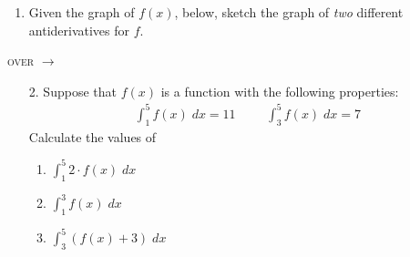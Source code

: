 \documentclass[11pt]{article}
\begin{document}
\pagestyle{empty}
\newsavebox{\quizfront}
\begin{lrbox}{\quizfront}
\begin{minipage}[top][4.5in][t]{\textwidth} \setlength{\parindent}{1.5em}
\drawtitle
\vspace{-0.5in}
\begin{enumerate}

\item Given the graph of $f(x)$, below, sketch the graph of
  \emph{two} different antiderivatives for $f$.
  \vfill
  \begin{center}
  \end{center}

  \vfill

\end{enumerate}

\hfill \textsc{over} $\longrightarrow$

\end{minipage}
\end{lrbox}

\newsavebox{\quizback}
\begin{lrbox}{\quizback}
\begin{minipage}[top][4.5in][t]{\textwidth} \setlength{\parindent}{1.5em}
\begin{enumerate}
\item[2.] Suppose that $f(x)$ is a function with the following properties:
  \begin{align*}
    \int_1^5 f(x)\;dx = 11 &&& \int_3^5 f(x)\;dx = 7
  \end{align*}
  Calculate the values of
  \begin{enumerate}
  \item $\displaystyle \int_1^5 2\cdot f(x)\;dx$
    \vfill
  \item $\displaystyle \int_1^3 f(x)\;dx$
    \vfill
  \item $\displaystyle \int_3^5 (f(x) + 3)\;dx$
    \vfill
  \end{enumerate}

\end{enumerate}
\end{minipage}
\end{lrbox}

\noindent \usebox{\quizfront}
\vfill
\noindent \usebox{\quizfront}

\pagebreak
\noindent \usebox{\quizback}
\vfill
\noindent \usebox{\quizback}
\end{document}
